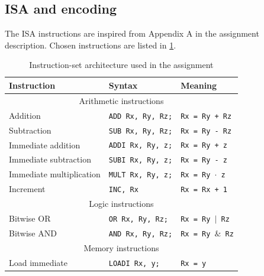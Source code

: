 \documentclass[a4paper, english]{article}
\numberwithin{equation}{section}
\begin{document}
\subsection{ISA and encoding}\label{sec:isa}
The ISA instructions are inspired from Appendix A in the assignment description. Chosen instructions are listed in \cref{tbl:ISA}.
\begin{table}[H]
    \centering
    \caption{Instruction-set architecture used in the assignment}\label{tbl:ISA}
    \begin{tabular}{lll}
        \toprule
        \textbf{Instruction}     & \textbf{Syntax}          & \textbf{Meaning}                 \\
        \midrule
        \multicolumn{3}{c}{Arithmetic instructions}                                            \\
        \midrule
        Addition                 & \texttt{ADD Rx, Ry, Rz;} & \texttt{Rx = Ry + Rz}            \\
        Subtraction              & \texttt{SUB Rx, Ry, Rz;} & \texttt{Rx = Ry - Rz}            \\
        Immediate addition       & \texttt{ADDI Rx, Ry, z;} & \texttt{Rx = Ry + z}             \\
        Immediate subtraction    & \texttt{SUBI Rx, Ry, z;} & \texttt{Rx = Ry - z}             \\
        Immediate multiplication & \texttt{MULT Rx, Ry, z;} & \texttt{Rx = Ry \(\cdot\) z}     \\
        Increment                & \texttt{INC, Rx}         & \texttt{Rx = Rx + 1}             \\
        \midrule
        \multicolumn{3}{c}{Logic instructions}                                                 \\
        \midrule
        Bitwise OR               & \texttt{OR Rx, Ry, Rz;}  & \texttt{Rx = Ry \(\vert\) Rz}    \\
        Bitwise AND              & \texttt{AND Rx, Ry, Rz;} & \texttt{Rx = Ry \(\&\) Rz}       \\
        \midrule
        \multicolumn{3}{c}{Memory instructions}                                                \\
        \midrule
        Load immediate           & \texttt{LOADI Rx, y;}    & \texttt{Rx = y}                  \\

\end{tabular}
\end{table}
\end{document}
